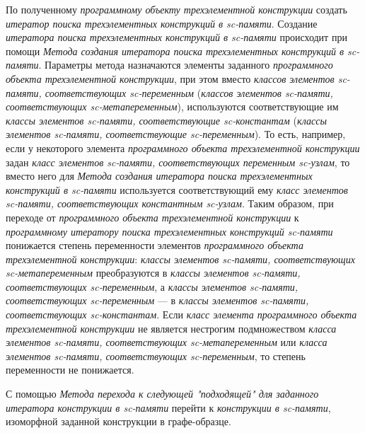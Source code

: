 \begin{SCn}
\begin{scnsubstruct}
\begin{scnsubstruct}
\begin{scnsubstruct}
\begin{scnsubstruct}
\begin{scnsubstruct}
\begin{scnsubstruct}
\begin{scnsubstruct}
\begin{scnsubstruct}
{\begin{scnitemize}
				\item По полученному \textit{программному объекту трехэлементной конструкции} создать \textit{итератор поиска трехэлементных конструкций в sc-памяти}. Создание \textit{итератора поиска трехэлементных конструкций в sc-памяти} происходит при помощи \textit{Метода создания итератора поиска трехэлементных конструкций в sc-памяти}. Параметры метода назначаются элементы заданного \textit{программного объекта трехэлементной конструкции}, при этом вместо \textit{классов элементов sc-памяти, соответствующих sc-переменным} (\textit{классов элементов sc-памяти, соответствующих sc-метапеременным}), используются соответствующие им \textit{классы элементов sc-памяти, соответствующие sc-константам} (\textit{классы элементов sc-памяти, соответствующие sc-переменным}). То есть, например, если у некоторого элемента \textit{программного объекта трехэлементной конструкции} задан \textit{класс элементов sc-памяти, соответствующих переменным sc-узлам}, то вместо него для \textit{Метода создания итератора поиска трехэлементных конструкций в sc-памяти} используется соответствующий ему \textit{класс элементов sc-памяти, соответствующих константным sc-узлам}. Таким образом, при переходе от \textit{программного объекта трехэлементной конструкции} к \textit{программному итератору поиска трехэлементных конструкций sc-памяти} понижается степень переменности элементов \textit{программного объекта трехэлементной конструкции}: \textit{классы элементов sc-памяти, соответствующих sc-метапеременным} преобразуются в \textit{классы элементов sc-памяти, соответствующих sc-переменным}, а \textit{классы элементов sc-памяти, соответствующих sc-переменным} --- в \textit{классы элементов sc-памяти, соответствующих sc-константам}. Если \textit{класс элемента программного объекта трехэлементной конструкции} не является нестрогим подмножеством \textit{класса элементов sc-памяти, соответствующих sc-метапеременным} или \textit{класса элементов sc-памяти, соответствующих sc-переменным}, то степень переменности не понижается.
				\item С помощью \textit{Метода перехода к следующей "подходящей" для заданного итератора конструкции в sc-памяти} перейти к \textit{конструкции в sc-памяти}, изоморфной заданной конструкции в графе-образце.
			\end{scnitemize}
			
}
\end{scnsubstruct}
\end{scnsubstruct}
\end{scnsubstruct}
\end{scnsubstruct}
\end{scnsubstruct}
\end{scnsubstruct}
\end{scnsubstruct}
\end{scnsubstruct}
\end{SCn}

